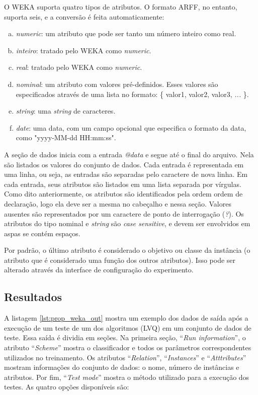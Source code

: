 O WEKA suporta quatro tipos de atributos. O formato ARFF, no entanto, suporta seis, e a conversão é feita automaticamente:

\begin{enumerate}[a)]
    \item \emph{numeric}: um atributo que pode ser tanto um número inteiro como real.
    \item \emph{inteiro}: tratado pelo WEKA como \emph{numeric}.
    \item \emph{real}: tratado pelo WEKA como \emph{numeric}.
    \item \emph{nominal}: um atributo com valores pré-definidos. Esses valores são especificados através de uma lista no formato: \{ valor1, valor2, valor3, \emph{...} \}.
    \item \emph{string}: uma \emph{string} de caracteres.
    \item \emph{date}: uma data, com um campo opcional que especifica o formato da data, como "yyyy-MM-dd HH:mm:ss".
\end{enumerate}

A seção de dados inicia com a entrada \emph{@data} e segue até o final do arquivo. Nela são listados os valores do conjunto de dados. Cada entrada é representada em uma linha, ou seja, as entradas são separadas pelo caractere de nova linha. Em cada entrada, seus atributos são listados em uma lista separada por vírgulas. Como dito anteriormente, os atributos são identificados pela ordem ordem de declaração, logo ela deve ser a mesma no cabeçalho e nessa seção. Valores ausentes são representados por um caractere de ponto de interrogação (\emph{?}). Os atributos do tipo nominal e \emph{string} são \emph{case sensitive}, e devem ser envolvidos em aspas se contém espaços.

Por padrão, o último atributo é considerado o objetivo ou classe da instância (o atributo que é considerado uma função dos outros atributos). Isso pode ser alterado através da interface de configuração do experimento.

\subsection{Resultados}
\label{sec:prop_results}

A listagem \ref{lst:prop_weka_out} mostra um exemplo dos dados de saída após a execução de um teste de um dos algoritmos (LVQ) em um conjunto de dados de teste. Essa saída é dividia em seções. Na primeira seção, ``\emph{Run information}'', o atributo ``\emph{Scheme}'' mostra o classificador e todos os parâmetros correspondentes utilizados no treinamento. Os atributos ``\emph{Relation}'', ``\emph{Instances}'' e ``\emph{Atttributes}'' mostram informações do conjunto de dados: o nome, número de instâncias e atributos. Por fim, ``\emph{Test mode}'' mostra o método utilizado para a execução dos testes. As quatro opções disponíveis são:

